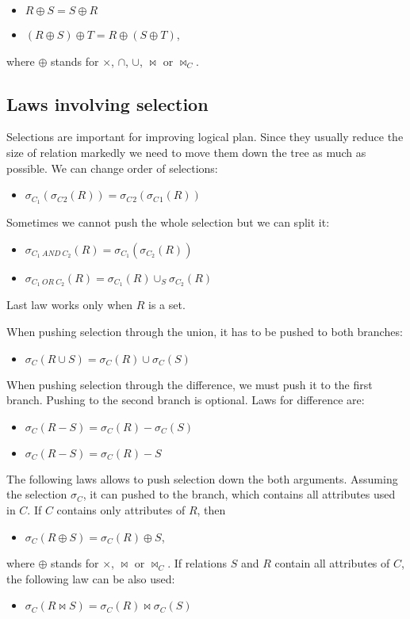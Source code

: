 \begin{itemize}
\item $R \oplus S = S \oplus R$

\item $(R \oplus S) \oplus T = R \oplus (S \oplus T)$,
\end{itemize}
where $\oplus$ stands for $\times$, $\cap$, $\cup$, $\Join$ or $\Join_C$.

\subsection{Laws involving selection}

Selections are important for improving logical plan. Since they usually reduce the size of relation markedly we need to move them down the tree as much as possible.
We can change order of selections:

\begin{itemize}
\item $\sigma_{C_1}(\sigma_C{_2}(R)) = \sigma_C{_2}(\sigma_C{_1}(R))$
\end{itemize}
Sometimes we cannot push the whole selection but we can split it:

\begin{itemize}
\item $\sigma_{C_1~AND~C_2}(R)=\sigma_{C_1}(\sigma_{C_2}(R))$

\item $\sigma_{C_1~OR~C_2}(R)=\sigma_{C_1}(R) \cup_S \sigma_{C_2}(R)$
\end{itemize}
Last law works only when $R$ is a set. 

When pushing selection through the union, it has to be pushed to both branches:
\begin{itemize}
\item $\sigma_{C}(R \cup S)=\sigma_{C}(R) \cup \sigma_{C}(S)$
\end{itemize}

When pushing selection through the difference, we must push it to the first branch. Pushing to the second branch is optional. Laws for difference are: 
\begin{itemize}
\item $\sigma_{C}(R-S)=\sigma_{C}(R) - \sigma_{C}(S)$
\item $\sigma_{C}(R-S)=\sigma_{C}(R) - S$
\end{itemize}

The following laws allows to push selection down the both arguments. Assuming the selection $\sigma_C$, it can pushed to the branch, which contains all attributes used in $C$. If $C$ contains only attributes of $R$, then
\begin{itemize}
\item $\sigma_{C}(R \oplus S)=\sigma_{C}(R) \oplus S$,
\end{itemize}
where $\oplus$ stands for $\times$, $\Join$ or $\Join_C$. If relations $S$ and $R$ contain all attributes of $C$, the following law can be also used:
\begin{itemize}
\item $\sigma_{C}(R \Join S)=\sigma_{C}(R) \Join  \sigma_{C}(S)$
\end{itemize}


